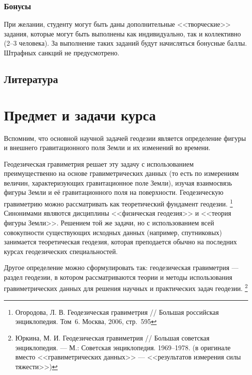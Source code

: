 \documentclass[11pt, a4paper]{article}
\theoremstyle{plain}
\theoremstyle{definition}
\theoremstyle{remark}
\begin{document}
\subsubsection{Бонусы}

При желании, студенту могут быть даны дополнительные <<творческие>> задания, которые могут быть
выполнены как индивидуально, так и коллективно (2--3 человека). За выполнение таких заданий будут
начисляться бонусные баллы. Штрафных санкций не предусмотрено.

\subsection{Литература}
\begin{refsection}
    \nocite{Shimbirev1975, Ogorodova2013, Yuzefovich2014}
    \printbibliography[title={\normalsize Рекомендуемая литература}]
\end{refsection}
\begin{refsection}
    \nocite{Yuzefovich1980, Torge1999, Ogorodova2006, Pellinen1978, Moritz2007, Moritz1983, Ogorodova2011}
    \printbibliography[title={\normalsize Дополнительная литература}]
\end{refsection}

\section{Предмет и задачи курса}
Вспомним, что основной научной задачей геодезии является определение фигуры и внешнего
гравитационного поля Земли и их изменений во времени. 

Геодезическая гравиметрия решает эту задачу
с использованием преимущественно на основе гравиметрических данных (то есть по измерениям величин,
характеризующих гравитационное поле Земли), изучая взаимосвязь фигуры Земли и её гравитационного
поля на поверхности. 
Геодезическую гравиметрию можно рассматривать как теоретический фундамент геодезии.
\footnote{Огородова, Л. В. Геодезическая гравиметрия // 
    Большая российская энциклопедия. Том~6. Москва, 2006, стр.~595}
Синонимами являются дисциплины <<физическая геодезия>> и <<теория фигуры Земли>>.
Решением той же задачи, но с использованием всей
совокупности существующих исходных данных (например, спутниковых) занимается теоретическая
геодезия, которая преподается обычно на последних курсах геодезических специальностей.

Другое определение можно сформулировать так: геодезическая гравиметрия ---
раздел геодезии, в котором рассматриваются теории и методы использования гравиметрических данных 
для решения научных и практических задач геодезии.
\footnote{Юркина, М. И. Геодезическая гравиметрия // Большая советская энциклопедия. --- М.:
Советская энциклопедия. 1969--1978. (в оригинале вместо <<гравиметрических данных>> ---
<<результатов измерения силы тяжести>>)}
\end{document}
